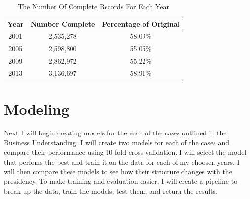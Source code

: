 \documentclass{article}
\begin{document}
    \begin{center}
        \begin{table}
            \centering
            \begin{tabular}{ |c|c|c| }
                \hline
                Year & Number Complete & Percentage of Original \\
                \hline
                2001 & 2,535,278 & 58.09\% \\
                2005 & 2,598,800 & 55.05\% \\
                2009 & 2,862,972 & 55.22\% \\
                2013 & 3,136,697 & 58.91\% \\
                \hline
            \end{tabular}
            \caption{The Number Of Complete Records For Each Year}
            \label{tab:6}
        \end{table}
    \end{center}

\section{Modeling}
Next I will begin creating models for the each of the cases outlined in the Business Understanding. I will create two models for each of the cases and compare their performance using 10-fold cross validation. I will select the model that perfoms the best and train it on the data for each of my choosen years. I will then compare these models to see how their structure changes with the presidency. To make training and evaluation easier, I will create a pipeline to break up the data, train the models, test them, and return the results.
\end{document}
